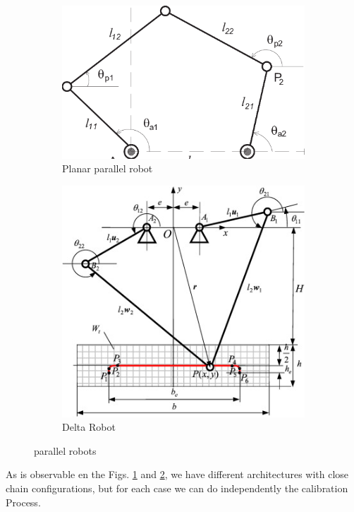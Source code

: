 \documentclass[12pt, twoside]{report}
\begin{document}
\begin{figure}[H]
     \centering
     \begin{subfigure}[b]{0.3\textwidth}
         \centering
         \includegraphics[width=\textwidth]{TP_2/parallel1.png}
         \caption{Planar parallel robot }
         \label{fig:st1a}
     \end{subfigure}
     \hfill
     \begin{subfigure}[b]{0.3\textwidth}
         \centering
         \includegraphics[width=\textwidth]{TP_2/parallel2.jpg}
         \caption{Delta Robot}
         \label{fig:st2a}
     \end{subfigure}
        \caption{parallel robots}
        \label{fig:stta}
\end{figure}
As is observable en the Figs. \ref{fig:st1a} and \ref{fig:st2a}, we have different architectures with close chain configurations, but for each case we can do independently the calibration Process.
\end{document}
